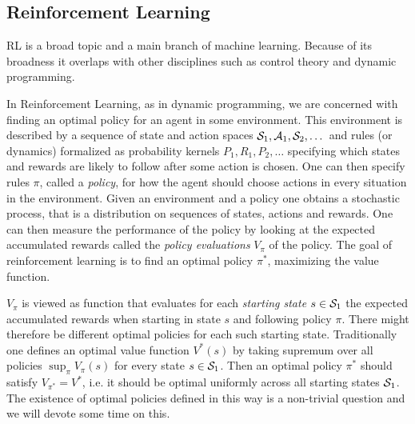
\subsection{Reinforcement Learning}

RL is a broad topic and a main branch of
machine learning. Because of its broadness it overlaps with other disciplines
such as control theory and dynamic programming.

In Reinforcement Learning, as in dynamic programming,
we are concerned with finding an optimal policy
for an agent in some environment.
This environment is described by
a sequence of state and action spaces
$\mathcal{S}_1, \mathcal{A}_1, \mathcal{S}_2, \dots$
and rules (or dynamics) formalized as probability kernels
$P_1, R_1, P_2, \dots$ specifying which states and rewards
are likely to follow after some action is chosen.
One can then specify rules $\pi$, called a \emph{policy},
for how the agent should choose actions in every situation in the environment.
Given an environment and a policy one obtains a stochastic process,
that is a distribution on sequences of states, actions and
rewards.
One can then measure the performance of the policy by looking at
the expected accumulated rewards called the \emph{policy evaluations}
$V_\pi$ of the policy.
The goal of reinforcement learning is to find an optimal policy $\pi^*$,
maximizing the value function.

$V_\pi$ is viewed as function that evaluates for each \emph{starting state}
$s \in \mathcal{S}_1$ the expected accumulated rewards when starting in state $s$
and following policy $\pi$.
There might therefore be different optimal policies for each such starting
state.
Traditionally one defines an optimal value function $V^*(s)$
by taking supremum over all policies $\sup_\pi V_\pi(s)$ for every state
$s \in \mathcal{S}_1$.
Then an optimal policy $\pi^*$ should satisfy $V_{\pi^*} = V^*$,
i.e. it should be optimal uniformly across all starting states $\mathcal{S}_1$.
The existence of optimal policies defined in this way is a non-trivial
question and we will devote some time on this.

